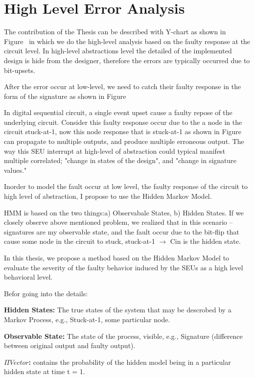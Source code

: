 \section{High Level Error Analysis}



The contribution of the Thesis can be described with Y-chart as shown in Figure~ in which we do the high-level analysis based on the faulty response at the circuit level. In high-level abstractions level the detailed of the implemented design is hide from the designer, therefore the errors are typically occurred due to bit-upsets. 

After the error occur at low-level, we need to catch their faulty response in the form of the signature as shown in Figure~ 


In digital sequential circuit, a single event upset cause a  faulty repose of the underlying circuit. Consider this faulty response occur due to the a node in the circuit stuck-at-1, now this node response that is stuck-at-1 as shown in Figure~ can propagate to multiple outputs, and produce multiple erroneous output. The way this SEU interrupt at high-level of abstraction could typical manifest multiple correlated; "change in states of the design", and "change in signature values."

Inorder to model the fault occur at low level, the faulty response of the circuit to high level of abstraction, I propose to use the Hidden Markov Model.


HMM is based on  the two things:a) Observabale States, b) Hidden States. If we closely observe above mentioned problem, we realized that in this scenario --  signatures are my observable state, and the fault occur due to the bit-flip that cause some node in the circuit to stuck, stuck-at-1 $\rightarrow$ Cin is the hidden state.

In this thesis, we propose a method based on the Hidden Markov Model to evaluate the severity of the faulty behavior induced by the SEUs as a high level behavioral level. 


Befor going into the details:

\textbf{Hidden States:} The true states of the system that may be descrobed by a Markov Process, e.g., Stuck-at-1, some particular node.

\textbf{Observable State:} The state of the process, visible, e.g., Signature (difference between original output and faulty output).

\textbf{$\Pi Vector$:} contains the probability of the hidden model being in a particular hidden state at time t = 1.

